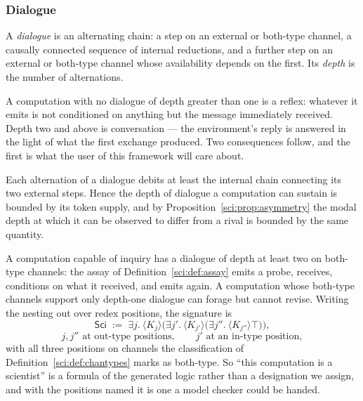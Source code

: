 \subsubsection*{Dialogue}

\begin{definition}
\label{sci:def:dialogue}
A \emph{dialogue} is an alternating chain: a step on an external or both-type channel, a causally
connected sequence of internal reductions, and a further step on an external or both-type channel
whose availability depends on the first. Its \emph{depth} is the number of alternations.
\end{definition}

A computation with no dialogue of depth greater than one is a reflex: whatever it emits is not
conditioned on anything but the message immediately received. Depth two and above is conversation ---
the environment's reply is answered in the light of what the first exchange produced. Two consequences
follow, and the first is what the user of this framework will care about.

\begin{proposition}
\label{sci:prop:dialoguebound}
Each alternation of a dialogue debits at least the internal chain connecting its two external steps.
Hence the depth of dialogue a computation can sustain is bounded by its token supply, and by
Proposition~\ref{sci:prop:asymmetry} the modal depth at which it can be observed to differ from a rival is
bounded by the same quantity.
\end{proposition}

\begin{proposition}
\label{sci:prop:sciencesig}
A computation capable of inquiry has a dialogue of depth at least two on both-type channels: the assay
of Definition~\ref{sci:def:assay} emits a probe, receives, conditions on what it received, and emits
again. A computation whose both-type channels support only depth-one dialogue can forage but cannot
revise. Writing the nesting out over redex positions, the signature is
\[
\mathsf{Sci} \;:=\; \exists j.\ \langle K_j \rangle\Big(\exists j'.\ \langle K_{j'} \rangle
\big(\exists j''.\ \langle K_{j''} \rangle \top\big)\Big),
\]
\[
j, j'' \text{ at out-type positions},\qquad j' \text{ at an in-type position},
\]
with all three positions on channels the classification of Definition~\ref{sci:def:chantypes} marks as
both-type. So ``this computation is a scientist'' is a formula of the generated logic rather than a
designation we assign, and with the positions named it is one a model checker could be handed.
\end{proposition}

